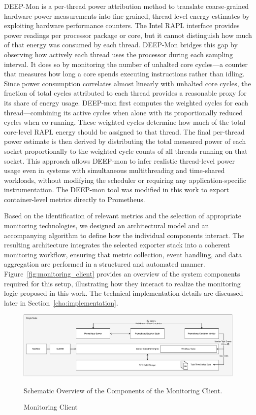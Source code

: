 DEEP-Mon is a per-thread power attribution method to translate coarse-grained hardware power measurements into fine-grained, thread-level energy estimates by exploiting hardware performance counters. The Intel RAPL interface provides power readings per processor package or core, but it cannot distinguish how much of that energy was consumed by each thread. DEEP-Mon bridges this gap by observing how actively each thread uses the processor during each sampling interval. It does so by monitoring the number of unhalted core cycles—a counter that measures how long a core spends executing instructions rather than idling. Since power consumption correlates almost linearly with unhalted core cycles, the fraction of total cycles attributed to each thread provides a reasonable proxy for its share of energy usage. DEEP-mon first computes the weighted cycles for each thread—combining its active cycles when alone with its proportionally reduced cycles when co-running. These weighted cycles determine how much of the total core-level RAPL energy should be assigned to that thread. The final per-thread power estimate is then derived by distributing the total measured power of each socket proportionally to the weighted cycle counts of all threads running on that socket. This approach allows DEEP-mon to infer realistic thread-level power usage even in systems with simultaneous multithreading and time-shared workloads, without modifying the scheduler or requiring any application-specific instrumentation. The DEEP-mon tool was modified in this work to export container-level metrics directly to Prometheus.

Based on the identification of relevant metrics and the selection of appropriate monitoring technologies, we designed an architectural model and an accompanying algorithm to define how the individual components interact. The resulting architecture integrates the selected exporter stack into a coherent monitoring workflow, ensuring that metric collection, event handling, and data aggregation are performed in a structured and automated manner. Figure~\ref{fig:monitoring_client} provides an overview of the system components required for this setup, illustrating how they interact to realize the monitoring logic proposed in this work. The technical implementation details are discussed later in Section~\ref{cha:implementation}.

\begin{figure}[H]
    \centering
    \includegraphics[scale=0.45]{fig/04/04-monitoring.pdf}
    \caption{Monitoring Client}
    \label{fig:04-monitoring}
    \tiny
    Schematic Overview of the Components of the Monitoring Client.
\end{figure}


